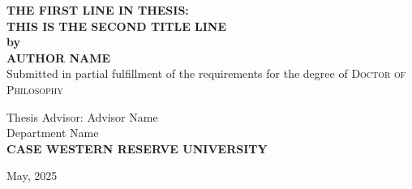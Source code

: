 \documentclass[12pt, oneside]{book}
\begin{document}


\begin{titlepage}
\begin{center}
\Large{\bfseries\MakeUppercase{
    The First Line in Thesis:\\ This is the Second Title Line\\
 }}
 \vspace{.5cm}
 \large{\bfseries{by}}\\
 \vspace{.5cm}
\Large{\bfseries\MakeUppercase{Author Name}}\\

\vspace{1cm}
 \large{Submitted in partial fulfillment of the requirements for the degree of \textsc{Doctor of Philosophy}}\\[0.75cm]
\vfill

{Thesis Advisor: Advisor Name} \vspace{0.4cm} \\[.75cm]
 \vfill
\large{Department Name}\\[.75cm]
\vfill
\large{\bfseries\MakeUppercase{Case Western Reserve University}}\\[0.5cm]
\vfill

{May, 2025}
\end{center}
\end{titlepage}
\end{document}
